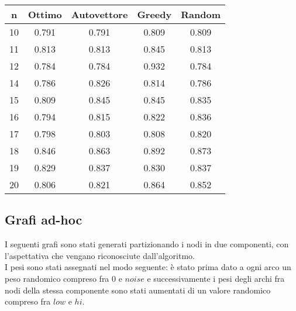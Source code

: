 \documentclass{article}
\begin{document}
\begin{multicols}{2}
\begin{center}
    \begin{tabular}{|c|c|c|c|c|}
        \hline
        n & Ottimo & Autovettore & Greedy & Random \\
        \hline
        \hline
        10 & 0.791 & 0.791 & 0.809 & 0.809 \\
        11 & 0.813 & 0.813 & 0.845 & 0.813 \\
        12 & 0.784 & 0.784 & 0.932 & 0.784 \\
        14 & 0.786 & 0.826 & 0.814 & 0.786 \\
        15 & 0.809 & 0.845 & 0.845 & 0.835 \\
        16 & 0.794 & 0.815 & 0.822 & 0.836 \\
        17 & 0.798 & 0.803 & 0.808 & 0.820 \\
        18 & 0.846 & 0.863 & 0.892 & 0.873 \\
        19 & 0.829 & 0.837 & 0.830 & 0.837 \\
        20 & 0.806 & 0.821 & 0.864 & 0.852 \\
        \hline
    \end{tabular}
\end{center}

\subsection{Grafi ad-hoc}
I seguenti grafi sono stati generati partizionando i nodi in due componenti,
con l'aspettativa che vengano riconosciute dall'algoritmo.\\
I pesi sono stati assegnati nel modo seguente: \`e stato prima dato a ogni arco un peso
randomico compreso fra $0$ e $noise$ e successivamente i pesi degli archi fra
nodi della stessa componente sono stati aumentati di un valore randomico compreso fra $low$ e $hi$.



\end{multicols}
\end{document}
